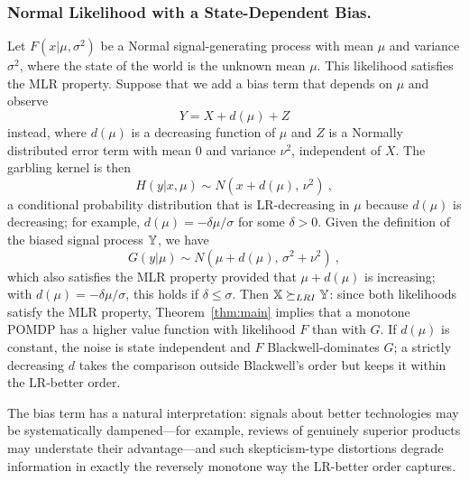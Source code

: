 \subsubsection{Normal Likelihood with a State-Dependent Bias.}
\label{sec:normal-example}
Let $F(x|\mu, \sigma^2)$ be a Normal signal-generating process with
mean $\mu$ and variance $\sigma^2$, where the state of the world is
the unknown mean $\mu$. This likelihood satisfies the MLR property.
Suppose that we add a bias term that depends on $\mu$ and observe
\begin{equation}
Y = X + d(\mu) + Z \label{eq:normal-garbling}
\end{equation}
instead, where $d(\mu)$ is a decreasing function of $\mu$ and $Z$ is a
Normally distributed error term with mean $0$ and variance $\nu^2$,
independent of $X$. The garbling kernel is then
\begin{equation}
H(y|x, \mu) \sim N(x+d(\mu),\, \nu^2) \ ,
\end{equation}
a conditional probability distribution that is LR-decreasing in $\mu$
because $d(\mu)$ is decreasing; for example, $d(\mu) =
-\delta\mu/\sigma$ for some $\delta > 0$. Given the definition of the
biased signal process ${\mathbb{Y}}$, we have
\begin{equation}
G(y|\mu) \sim N(\mu+d(\mu),\, \sigma^2+\nu^2) \ ,
\end{equation}
which also satisfies the MLR property provided that $\mu + d(\mu)$ is
increasing; with $d(\mu) = -\delta\mu/\sigma$, this holds if
$\delta \leq \sigma$. Then ${\mathbb{X}} \succeq_{LRI} {\mathbb{Y}}$: since both likelihoods
satisfy the MLR property, Theorem~\ref{thm:main} implies that a
monotone POMDP has a higher value function with likelihood $F$ than
with $G$. If $d(\mu)$ is constant, the noise is state independent and
$F$ Blackwell-dominates $G$; a strictly decreasing $d$ takes the
comparison outside Blackwell's order but keeps it within the LR-better
order.

The bias term has a natural interpretation: signals about better
technologies may be systematically dampened---for example, reviews of
genuinely superior products may understate their advantage---and such
skepticism-type distortions degrade information in exactly the
reversely monotone way the LR-better order captures.

